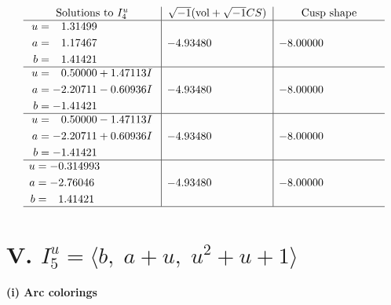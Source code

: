 \documentclass[1p]{elsarticle_modified}
\theoremstyle{definition}
\newcommand{\I}{\sqrt{-1}}
\begin{document}
$$\begin{array}{c|c|c}  
\text{Solutions to }I^u_{4}& \I (\text{vol} + \sqrt{-1}CS) & \text{Cusp shape}\\
 \hline 
\begin{aligned}
u &= \phantom{-}1.31499\phantom{ +0.000000I} \\
a &= \phantom{-}1.17467\phantom{ +0.000000I} \\
b &= \phantom{-}1.41421\phantom{ +0.000000I}\end{aligned}
 & -4.93480\phantom{ +0.000000I} & -8.00000\phantom{ +0.000000I} \\ \hline\begin{aligned}
u &= \phantom{-}0.50000 + 1.47113 I \\
a &= -2.20711 - 0.60936 I \\
b &= -1.41421\phantom{ +0.000000I}\end{aligned}
 & -4.93480\phantom{ +0.000000I} & -8.00000\phantom{ +0.000000I} \\ \hline\begin{aligned}
u &= \phantom{-}0.50000 - 1.47113 I \\
a &= -2.20711 + 0.60936 I \\
b &= -1.41421\phantom{ +0.000000I}\end{aligned}
 & -4.93480\phantom{ +0.000000I} & -8.00000\phantom{ +0.000000I} \\ \hline\begin{aligned}
u &= -0.314993\phantom{ +0.000000I} \\
a &= -2.76046\phantom{ +0.000000I} \\
b &= \phantom{-}1.41421\phantom{ +0.000000I}\end{aligned}
 & -4.93480\phantom{ +0.000000I} & -8.00000\phantom{ +0.000000I}\\
 \hline 
 \end{array}$$\newpage\newpage\renewcommand{\arraystretch}{1}
\centering \section*{V. $I^u_{5}= \langle b,\;a+u,\;u^2+u+1 \rangle$}
\flushleft \textbf{(i) Arc colorings}\\
\end{document}
